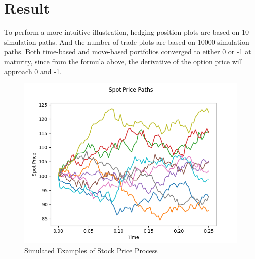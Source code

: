 \documentclass[12pt]{article}
\begin{document}
\section{Result}
To perform a more intuitive illustration, hedging position plots are based on 10 simulation paths. And the number of trade plots are based on 10000 simulation paths. Both time-based and move-based portfolios converged to either 0 or -1 at maturity, since from the formula above, 
the derivative of the option price will approach 0 and -1.
\begin{figure}[H]
  \centering
  \includegraphics[scale=0.8]{price.png}
  \caption{Simulated Examples of Stock Price Process}
\end{figure}
\end{document}
